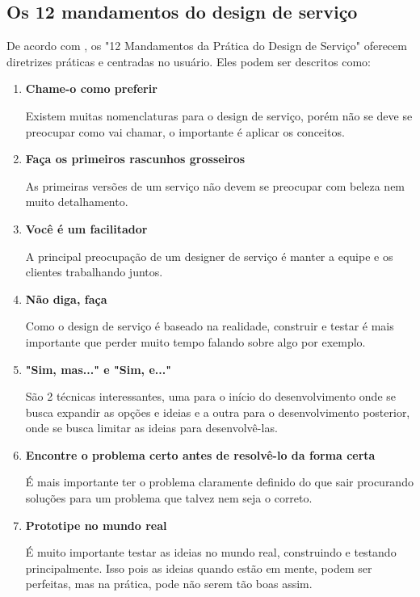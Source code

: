 \subsection{Os 12 mandamentos do design de serviço}

De acordo com \cite{Stickdorn2019}, os "12 Mandamentos da Prática do Design de Serviço" oferecem diretrizes práticas e centradas no usuário. Eles podem ser descritos como:

\begin{enumerate}
	\item \textbf{Chame-o como preferir}
	
	Existem muitas nomenclaturas para o design de serviço, porém não se deve se preocupar como vai chamar, o importante é aplicar os conceitos.
	
	\item \textbf{Faça os primeiros rascunhos grosseiros}
	
	As primeiras versões de um serviço não devem se preocupar com beleza nem muito detalhamento.
	
	\item \textbf{Você é um facilitador}
	
	A principal preocupação de um designer de serviço é manter a equipe e os clientes trabalhando juntos.
	
	\item \textbf{Não diga, faça}
	
	Como o design de serviço é baseado na realidade, construir e testar é mais importante que perder muito tempo falando sobre algo por exemplo.
	
	\item \textbf{"Sim, mas..." e "Sim, e..."}
	
	São 2 técnicas interessantes, uma para o início do desenvolvimento onde se busca expandir as opções e ideias e a outra para o desenvolvimento posterior, onde se busca limitar as ideias para desenvolvê-las.
	
	\item \textbf{Encontre o problema certo antes de resolvê-lo da forma certa}
	
	É mais importante ter o problema claramente definido do que sair procurando soluções para um problema que talvez nem seja o correto.
	
	\item \textbf{Prototipe no mundo real}
	
 	É muito importante testar as ideias no mundo real, construindo e testando principalmente. Isso pois as ideias quando estão em mente, podem ser perfeitas, mas na prática, pode não serem tão boas assim.
	

\end{enumerate}
